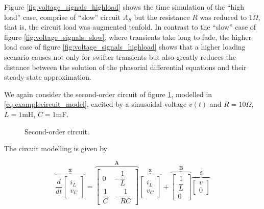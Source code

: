 	Figure \ref{fig:voltage_signals_highload} shows the time simulation of the ``high load'' case, comprise of ``slow'' circuit $A_S$ but the resistance $R$ was reduced to $1\Omega$, that is, the circuit load was augmented tenfold. In contrast to the ``slow'' case of figure \ref{fig:voltage_signals_slow}, where transients take long to fade, the higher load case of figure \ref{fig:voltage_signals_highload} shows that a higher loading scenario causes not only for swifter transients but also greatly reduces the distance between the solution of the phasorial differential equations and their steady-state approximation.

\begin{example}\label{example:rlc_timescales}

	We again consider the second-order circuit of figure \ref{fig:secondordercircuit}, modelled in \eqref{eq:examplecircuit_model}, excited by a sinusoidal voltage $v(t)$ and $R = 10\Omega$, $L = 1$mH, $C = 1$mF.

\begin{figure}[htb!]
\centering
	\caption{Second-order circuit.}
	\label{fig:secondordercircuit}
\end{figure} %

	The circuit modelling is given by

\begin{equation}\overbrace{\dfrac{d}{dt}\left[\begin{array}{c} i_L \\ v_C \end{array}\right]}^{\dot{\mathbf{x}}} = \overbrace{\left[\begin{array}{cc} 0 & -\dfrac{1}{L} \\[3mm] \dfrac{1}{C} & -\dfrac{1}{RC} \end{array}\right]}^{\mathbf{A}} \overbrace{\left[\begin{array}{c} i_L \\ v_C \end{array}\right]}^{\mathbf{x}} + \overbrace{\left[\begin{array}{c} \dfrac{1}{L}\\[3mm] 0\end{array}\right]}^{\mathbf{B}} \overbrace{\left[\begin{array}{c} v \\ 0 \end{array}\right]}^{\mathbf{f}} \label{eq:examplecircuit_model}\end{equation}


\end{example}
